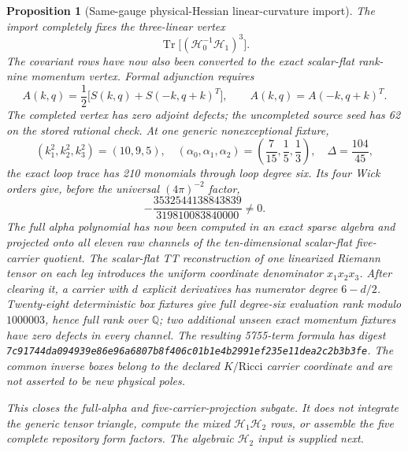 \documentclass[11pt]{article}
\newtheorem{proposition}[theorem]{Proposition}
\theoremstyle{definition}
\theoremstyle{remark}
\begin{document}
\begin{proposition}[Same-gauge physical-Hessian linear-curvature import]
The import completely fixes the three-linear vertex
\[
 \operatorname{Tr}\bigl[(\mathcal H_0^{-1}\mathcal H_1)^3\bigr].
\]
The covariant rows have now also been converted to the exact scalar-flat
rank-nine momentum vertex.  Formal adjunction requires
\[
 A(k,q)=\frac12\bigl[S(k,q)+S(-k,q+k)^T\bigr],
 \qquad A(k,q)=A(-k,q+k)^T.
\]
The completed vertex has zero adjoint defects; the uncompleted source seed
has 62 on the stored rational check.  At one generic nonexceptional fixture,
\[
 (k_1^2,k_2^2,k_3^2)=(10,9,5),\quad
 (\alpha_0,\alpha_1,\alpha_2)=\left(\frac7{15},\frac15,\frac13\right),
 \quad \Delta=\frac{104}{45},
\]
the exact loop trace has 210 monomials through loop degree six.  Its four Wick
orders give, before the universal $(4\pi)^{-2}$ factor,
\[
 -\frac{3532544138843839}{319810083840000}\ne0.
\]
The full alpha polynomial has now been computed in an exact sparse algebra
and projected onto all eleven raw channels of the ten-dimensional
scalar-flat five-carrier quotient.  The scalar-flat TT reconstruction of one
linearized Riemann tensor on each leg introduces the uniform coordinate
denominator $x_1x_2x_3$.  After clearing it, a carrier with $d$ explicit
derivatives has numerator degree $6-d/2$.  Twenty-eight deterministic box
fixtures give full degree-six evaluation rank modulo $1000003$, hence full
rank over $\mathbb Q$; two additional unseen exact momentum fixtures have
zero defects in every channel.  The resulting 5755-term formula has digest
\nolinkurl{7c91744da094939e86e96a6807b8f406c01b1e4b2991ef235e11dea2c2b3b3fe}.
The common inverse boxes belong to the declared $K/\mathrm{Ricci}$ carrier
coordinate and are not asserted to be new physical poles.

This closes the full-alpha and five-carrier-projection subgate.  It does not
integrate the generic tensor triangle, compute the mixed
$\mathcal H_1\mathcal H_2$ rows, or assemble the five complete repository
form factors.  The algebraic $\mathcal H_2$ input is supplied next.
\end{proposition}
\end{document}
